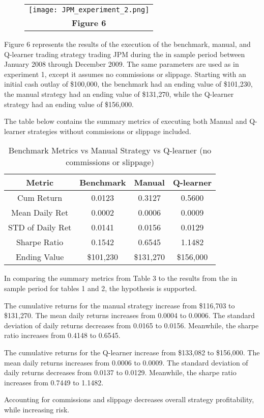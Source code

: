 \documentclass[
	letterpaper, %
]{jdf}
\begin{document}
\begin{figure}[h]
	\begin{tabular}{c}
		\texttt{[image: JPM\_experiment\_2.png]} \\
		\textbf{Figure 6} \\ 
	\end{tabular}
\end{figure}

Figure 6 represents the results of the execution of the benchmark, manual, and Q-learner trading strategy trading JPM during the in sample period between January 2008 through December 2009. The same parameters are used as in experiment 1, except it assumes no commissions or slippage. Starting with an initial cash outlay of \$100,000, the benchmark had an ending value of \$101,230, the manual strategy had an ending value of \$131,270, while the Q-learner strategy had an ending value of \$156,000.

The table below contains the summary metrics of executing both Manual and Q-learner strategies without commissions or slippage included.

\begin{table}[h]
\centering
\begin{tabular}{ c | c | c | c }
  \hline
  Metric & Benchmark & Manual & Q-learner \\
  \hline   
  
Cum Return & 0.0123 & 0.3127 & 0.5600 \\
Mean Daily Ret & 0.0002 & 0.0006 & 0.0009\\
STD of Daily Ret & 0.0141 & 0.0156 & 0.0129\\
Sharpe Ratio & 0.1542 & 0.6545 & 1.1482\\
Ending Value & \$101,230 & \$131,270 & \$156,000 \\
  \hline
\end{tabular}
\caption{Benchmark Metrics vs Manual Strategy vs Q-learner (no commissions or slippage)}
\label{tbl:topic_overlap}
\end{table}

In comparing the summary metrics from Table 3 to the results from the in sample period for tables 1 and 2, the hypothesis is supported. 

The cumulative returns for the manual strategy increase from \$116,703 to \$131,270. The mean daily returns increases from 0.0004 to 0.0006.  The standard deviation of daily returns decreases from 0.0165 to 0.0156. Meanwhile, the sharpe ratio increases from 0.4148 to 0.6545.

The cumulative returns for the Q-learner increase from \$133,082 to \$156,000. The mean daily returns increases from 0.0006 to 0.0009.  The standard deviation of daily returns decreases from 0.0137 to 0.0129. Meanwhile, the sharpe ratio increases from 0.7449 to 1.1482.

Accounting for commissions and slippage decreases overall strategy profitability, while increasing risk.


\makeatletter
\renewcommand\@biblabel[1]{\textbullet}
\makeatother
\end{document}
